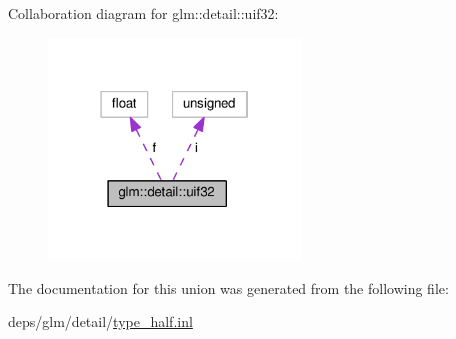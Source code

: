 Collaboration diagram for glm\+:\+:detail\+:\+:uif32\+:
\nopagebreak
\begin{figure}[H]
\begin{center}
\leavevmode
\includegraphics[width=190pt]{d4/ddc/unionglm_1_1detail_1_1uif32__coll__graph}
\end{center}
\end{figure}


The documentation for this union was generated from the following file\+:\begin{DoxyCompactItemize}
\item 
deps/glm/detail/\hyperlink{type__half_8inl}{type\+\_\+half.\+inl}\end{DoxyCompactItemize}
